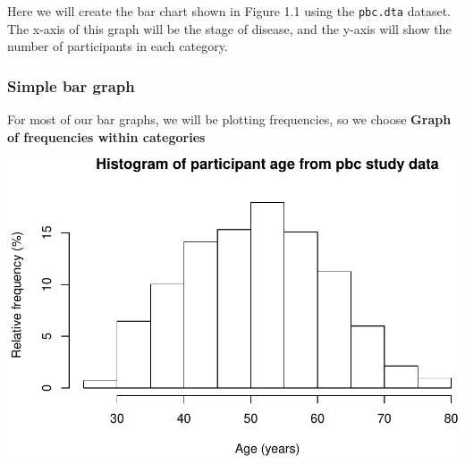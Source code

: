 \documentclass[
]{memoir}
\newenvironment{Shaded}{\begin{snugshade}}{\end{snugshade}}
\newcommand{\AttributeTok}[1]{\textcolor[rgb]{0.77,0.63,0.00}{#1}}
\newcommand{\CommentTok}[1]{\textcolor[rgb]{0.56,0.35,0.01}{\textit{#1}}}
\newcommand{\DecValTok}[1]{\textcolor[rgb]{0.00,0.00,0.81}{#1}}
\newcommand{\FunctionTok}[1]{\textcolor[rgb]{0.00,0.00,0.00}{#1}}
\newcommand{\NormalTok}[1]{#1}
\newcommand{\OtherTok}[1]{\textcolor[rgb]{0.56,0.35,0.01}{#1}}
\newcommand{\SpecialCharTok}[1]{\textcolor[rgb]{0.00,0.00,0.00}{#1}}
\newcommand{\StringTok}[1]{\textcolor[rgb]{0.31,0.60,0.02}{#1}}
\begin{document}
Here we will create the bar chart shown in Figure 1.1 using the \texttt{pbc.dta} dataset. The x-axis of this graph will be the stage of disease, and the y-axis will show the number of participants in each category.

\hypertarget{simple-bar-graph}{%
\subsubsection{Simple bar graph}\label{simple-bar-graph}}

For most of our bar graphs, we will be plotting frequencies, so we choose \textbf{Graph of frequencies within categories}

\begin{Shaded}
\end{Shaded}

\includegraphics{phcm9795-R-notes_files/figure-latex/unnamed-chunk-34-1.pdf}
\end{document}
